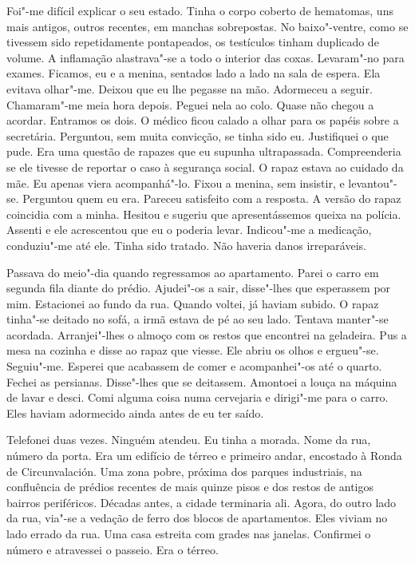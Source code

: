 Foi"-me difícil explicar o seu estado. Tinha o corpo coberto de
hematomas, uns mais antigos, outros recentes, em manchas sobrepostas. No
baixo"-ventre, como se tivessem sido repetidamente pontapeados, os
testículos tinham duplicado de volume. A inflamação alastrava"-se a todo
o interior das coxas. Levaram"-no para exames. Ficamos, eu e a menina,
sentados lado a lado na sala de espera. Ela evitava olhar"-me. Deixou
que eu lhe pegasse na mão. Adormeceu a seguir. Chamaram"-me meia hora
depois. Peguei nela ao colo. Quase não chegou a acordar. Entramos os
dois. O médico ficou calado a olhar para os papéis sobre a secretária.
Perguntou, sem muita convicção, se tinha sido eu. Justifiquei o que
pude. Era uma questão de rapazes que eu supunha ultrapassada.
Compreenderia se ele tivesse de reportar o caso à segurança social. O
rapaz estava ao cuidado da mãe. Eu apenas viera acompanhá"-lo. Fixou a
menina, sem insistir, e levantou"-se. Perguntou quem eu era. Pareceu
satisfeito com a resposta. A versão do rapaz coincidia com a minha.
Hesitou e sugeriu que apresentássemos queixa na polícia. Assenti e ele
acrescentou que eu o poderia levar. Indicou"-me a medicação,
conduziu"-me até ele. Tinha sido tratado. Não haveria danos
irreparáveis.

Passava do meio"-dia quando regressamos ao apartamento. Parei o carro em
segunda fila diante do prédio. Ajudei"-os a sair, disse"-lhes que
esperassem por mim. Estacionei ao fundo da rua. Quando voltei, já haviam
subido. O rapaz tinha"-se deitado no sofá, a irmã estava de pé ao seu
lado. Tentava manter"-se acordada. Arranjei"-lhes o almoço com os restos
que encontrei na geladeira. Pus a mesa na cozinha e disse ao rapaz que
viesse. Ele abriu os olhos e ergueu"-se. Seguiu"-me. Esperei que
acabassem de comer e acompanhei"-os até o quarto. Fechei as persianas.
Disse"-lhes que se deitassem. Amontoei a louça na máquina de lavar e
desci. Comi alguma coisa numa cervejaria e dirigi"-me para o carro. Eles
haviam adormecido ainda antes de eu ter saído.

Telefonei duas vezes. Ninguém atendeu. Eu tinha a morada. Nome da rua,
número da porta. Era um edifício de térreo e primeiro andar,
encostado à Ronda de Circunvalación. Uma zona pobre, próxima dos parques
industriais, na confluência de prédios recentes de mais quinze pisos e
dos restos de antigos bairros periféricos. Décadas antes, a cidade
terminaria ali. Agora, do outro lado da rua, via"-se a vedação de ferro
dos blocos de apartamentos. Eles viviam no lado errado da rua. Uma casa
estreita com grades nas janelas. Confirmei o número e atravessei o
passeio. Era o térreo.

